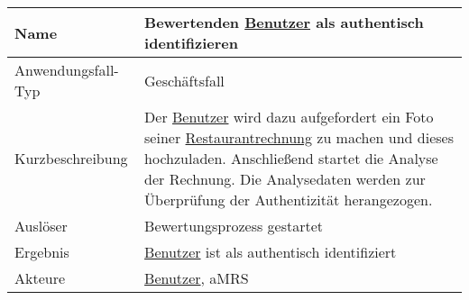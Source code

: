 \begin{table}[H]
    \centering
    \label{BewertungAuthentischIndentifizieren}
    \begin{tabularx}{\textwidth}{| l | X |}
        \hline
        Name               & Bewertenden \hyperref[gls:nutzer]{Benutzer} als authentisch identifizieren                                                                                                                                                                                                                \\
        \hline
        Anwendungsfall-Typ & Geschäftsfall                                                                                                                                                                                                                                                                             \\
        \hline
        Kurzbeschreibung   & Der \hyperref[gls:nutzer]{Benutzer} wird dazu aufgefordert ein Foto seiner \hyperref[gls:restaurantRechnung]{Restaurantrechnung} zu machen und dieses hochzuladen. Anschließend startet die Analyse der Rechnung. Die Analysedaten werden zur Überprüfung der Authentizität herangezogen. \\
        \hline
        Auslöser           & Bewertungsprozess gestartet                                                                                                                                                                                                                                                               \\
        \hline
        Ergebnis           & \hyperref[gls:nutzer]{Benutzer} ist als authentisch identifiziert                                                                                                                                                                                                                         \\
        \hline
        Akteure            & \hyperref[gls:nutzer]{Benutzer}, \ac{aMRS}                                                                                                                                                                                                                                                \\
        \hline
    \end{tabularx}
\end{table}

